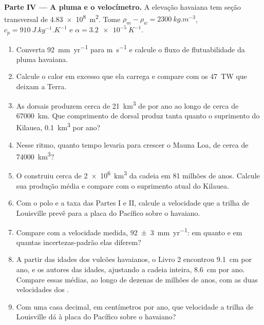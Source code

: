 \begin{problem}
\medskip
\noindent\textbf{Parte IV --- A pluma e o velocímetro.} A elevação havaiana tem seção transversal de \qty{4.83e8}{m^2}. Tome
$\rho_m - \rho_w = \qty{2300}{kg.m^{-3}}$, $c_p = \qty{910}{J.kg^{-1}.K^{-1}}$
e $\alpha = \qty{3.2e-5}{K^{-1}}$.
\begin{enumerate}[resume]
  \item Converta \qty{92}{mm.yr^{-1}} para \unit{m.s^{-1}} e calcule o fluxo de flutuabilidade da pluma havaiana.
  \item Calcule o calor em excesso que ela carrega e compare com os \qty{47}{TW} que deixam a Terra.
  \item As dorsais produzem cerca de \qty{21}{km^3} de  por ano ao longo de cerca de \qty{67000}{km}. Que comprimento de dorsal produz tanta  quanto o suprimento do Kilauea, \qty{0.1}{km^3} por ano?
  \item Nesse ritmo, quanto tempo levaria para crescer o Mauna Loa, de cerca de \qty{74000}{km^3}?
  \item O  construiu cerca de \qty{2e6}{km^3} da cadeia em 81 milhões de anos. Calcule sua produção média e compare com o suprimento atual do Kilauea.
  \item Com o polo e a taxa das Partes I e II, calcule a velocidade que a trilha de Louisville prevê para a placa do Pacífico sobre o  havaiano.
  \item Compare com a velocidade medida, \qty[uncertainty-mode=separate]{92 \pm 3}{mm.yr^{-1}}: em quanto e em quantas incertezas-padrão elas diferem?
  \item A partir das idades dos vulcões havaianos, o Livro 2 encontrou \qty{9.1}{cm} por ano, e os autores das idades, ajustando a cadeia inteira, \qty{8.6}{cm} por ano. Compare essas médias, ao longo de dezenas de milhões de anos, com as duas velocidades dos .
  \item Com uma casa decimal, em centímetros por ano, que velocidade a trilha de Louisville dá à placa do Pacífico sobre o  havaiano?
\end{enumerate}
\end{problem}
